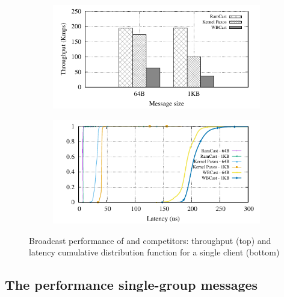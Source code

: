 \begin{figure}[htp!]
  \begin{subfigure}{\columnwidth}
    \advance\leftskip-0.1cm
    \includegraphics[width=0.99\columnwidth]{figures/benchmark/graphs/figure-compare-single-group-throughput}
  \end{subfigure}
  \begin{subfigure}{\columnwidth}
    \centering
    \includegraphics[width=0.95\columnwidth]{figures/benchmark/graphs/figure-compare-single-group-latency-cdf}
  \end{subfigure}
  \caption{Broadcast performance of \libname and competitors: throughput (top) and latency cumulative distribution function for a single client (bottom)}
  \label{fig:broadcast}
\end{figure}


\subsection{The performance single-group messages}
\label{sec:evaluation:multicast}

